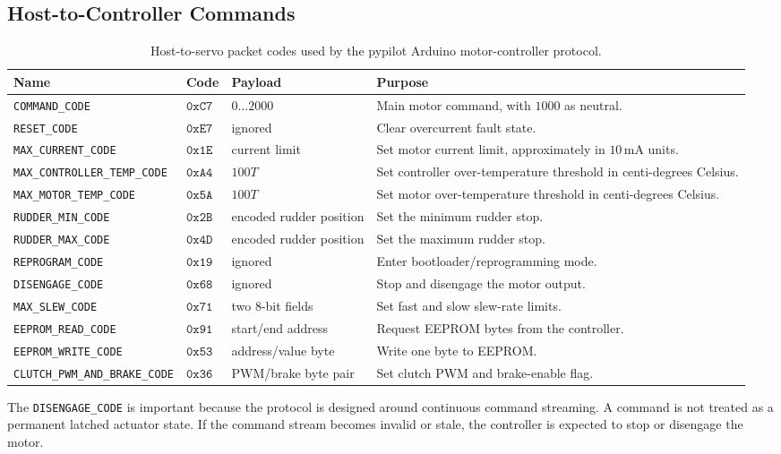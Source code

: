 \documentclass[11pt,twocolumn]{article}
\begin{document}
\subsection{Host-to-Controller Commands}
\begin{table}[t]
\centering
\caption{Host-to-servo packet codes used by the pypilot Arduino motor-controller protocol.}
\label{tab:pypilot-servo-host-codes}
\begin{tabularx}{\textwidth}{Z{0.24\textwidth}Z{0.10\textwidth}Z{0.20\textwidth}Y}
\toprule
Name & Code & Payload & Purpose \\
\midrule
\texttt{COMMAND\_CODE} &
\(\mathtt{0xC7}\) &
\(0\ldots 2000\) &
Main motor command, with \(1000\) as neutral. \\
\texttt{RESET\_CODE} &
\(\mathtt{0xE7}\) &
ignored &
Clear overcurrent fault state. \\
\texttt{MAX\_CURRENT\_CODE} &
\(\mathtt{0x1E}\) &
current limit &
Set motor current limit, approximately in \(10\,\mathrm{mA}\) units. \\
\texttt{MAX\_CONTROLLER\_TEMP\_CODE} &
\(\mathtt{0xA4}\) &
\(100T\) &
Set controller over-temperature threshold in centi-degrees Celsius. \\
\texttt{MAX\_MOTOR\_TEMP\_CODE} &
\(\mathtt{0x5A}\) &
\(100T\) &
Set motor over-temperature threshold in centi-degrees Celsius. \\
\texttt{RUDDER\_MIN\_CODE} &
\(\mathtt{0x2B}\) &
encoded rudder position &
Set the minimum rudder stop. \\
\texttt{RUDDER\_MAX\_CODE} &
\(\mathtt{0x4D}\) &
encoded rudder position &
Set the maximum rudder stop. \\
\texttt{REPROGRAM\_CODE} &
\(\mathtt{0x19}\) &
ignored &
Enter bootloader/reprogramming mode. \\
\texttt{DISENGAGE\_CODE} &
\(\mathtt{0x68}\) &
ignored &
Stop and disengage the motor output. \\
\texttt{MAX\_SLEW\_CODE} &
\(\mathtt{0x71}\) &
two 8-bit fields &
Set fast and slow slew-rate limits. \\
\texttt{EEPROM\_READ\_CODE} &
\(\mathtt{0x91}\) &
start/end address &
Request EEPROM bytes from the controller. \\
\texttt{EEPROM\_WRITE\_CODE} &
\(\mathtt{0x53}\) &
address/value byte &
Write one byte to EEPROM. \\
\texttt{CLUTCH\_PWM\_AND\_BRAKE\_CODE} &
\(\mathtt{0x36}\) &
PWM/brake byte pair &
Set clutch PWM and brake-enable flag. \\
\bottomrule
\end{tabularx}
\end{table}
The \texttt{DISENGAGE\_CODE} is important because the protocol is
designed around continuous command streaming.  A command is not treated as
a permanent latched actuator state.  If the command stream becomes invalid
or stale, the controller is expected to stop or disengage the motor.
\end{document}
